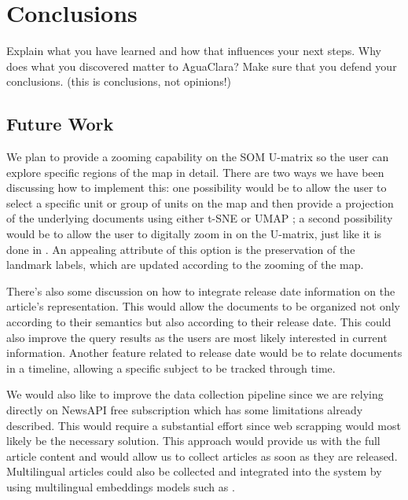 \documentclass[a4paper]{article}
\begin{document}
\section*{Conclusions}
Explain what you have learned and how that influences your next steps. Why does what you discovered matter to AguaClara?
Make sure that you defend your conclusions. (this is conclusions, not opinions!)

\subsection*{Future Work}

We plan to provide a zooming capability on the SOM U-matrix so the user can explore specific regions of the map in detail. There are two ways we have been discussing how to implement this: one possibility would be to allow the user to select a specific unit or group of units on the map and then provide a projection of the underlying documents using either t-SNE \citep{vandermaaten2008} or UMAP \citep{mcinnes2020}; a second possibility would be to allow the user to digitally zoom in on the U-matrix, just like it is done in \citet{kaski1998}. An appealing attribute of this option is the preservation of the landmark labels, which are updated according to the zooming of the map.

There's also some discussion on how to integrate release date information on the article's representation. This would allow the documents to be organized not only according to their semantics but also according to their release date. This could also improve the query results as the users are most likely interested in current information. Another feature related to release date would be to relate documents in a timeline, allowing a specific subject to be tracked through time. 

We would also like to improve the data collection pipeline since we are relying directly on NewsAPI free subscription which has some limitations already described. This would require a substantial effort since web scrapping would most likely be the necessary solution. This approach would provide us with the full article content and would allow us to collect articles as soon as they are released. Multilingual articles could also be collected and integrated into the system by using multilingual embeddings models such as \citet{conneau2019}.
\end{document}
